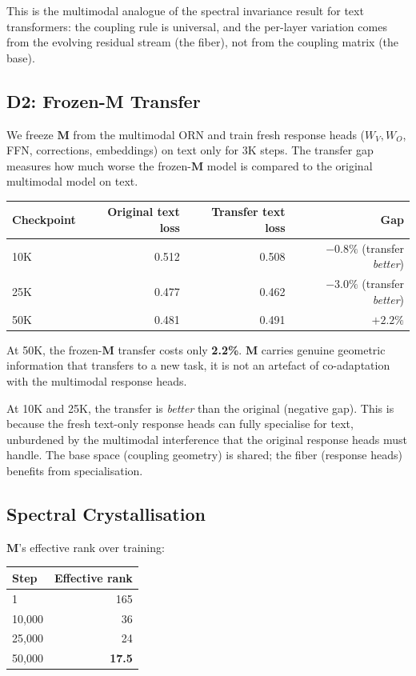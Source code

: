\documentclass[11pt, a4paper]{article}
\newcommand{\M}{\mathbf{M}}
\theoremstyle{plain}
\theoremstyle{remark}
\begin{document}
This is the multimodal analogue of the spectral invariance result for text transformers: the coupling rule is universal, and the per-layer variation comes from the evolving residual stream (the fiber), not from the coupling matrix (the base).

\subsection{D2: Frozen-M Transfer}

We freeze $\M$ from the multimodal ORN and train fresh response heads ($W_V, W_O$, FFN, corrections, embeddings) on text only for 3K steps.
The transfer gap measures how much worse the frozen-$\M$ model is compared to the original multimodal model on text.

\begin{center}\small
\begin{tabular}{@{}lrrr@{}}
\toprule
\textbf{Checkpoint} & \textbf{Original text loss} & \textbf{Transfer text loss} & \textbf{Gap} \\
\midrule
10K  & 0.512 & 0.508 & $-0.8\%$ (transfer \emph{better}) \\
25K  & 0.477 & 0.462 & $-3.0\%$ (transfer \emph{better}) \\
50K  & 0.481 & 0.491 & $+2.2\%$ \\
\bottomrule
\end{tabular}
\end{center}

At 50K, the frozen-$\M$ transfer costs only \textbf{2.2\%}.
$\M$ carries genuine geometric information that transfers to a new task, it is not an artefact of co-adaptation with the multimodal response heads.

At 10K and 25K, the transfer is \emph{better} than the original (negative gap).
This is because the fresh text-only response heads can fully specialise for text, unburdened by the multimodal interference that the original response heads must handle.
The base space (coupling geometry) is shared; the fiber (response heads) benefits from specialisation.

\subsection{Spectral Crystallisation}

$\M$'s effective rank over training:

\begin{center}\small
\begin{tabular}{@{}lr@{}}
\toprule
\textbf{Step} & \textbf{Effective rank} \\
\midrule
1 & 165 \\
10,000 & 36 \\
25,000 & 24 \\
50,000 & \textbf{17.5} \\
\bottomrule
\end{tabular}
\end{center}
\end{document}
